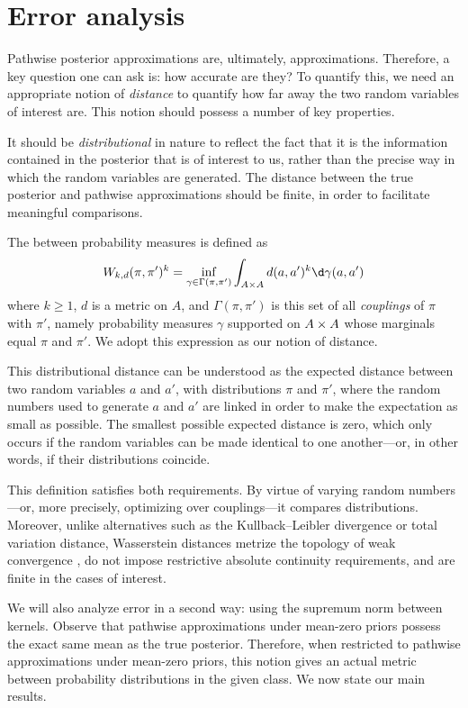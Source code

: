 \documentclass[11pt]{book}
\begin{document}
\section{Error analysis}

Pathwise posterior approximations are, ultimately, approximations.
Therefore, a key question one can ask is: how accurate are they?
To quantify this, we need an appropriate notion of \emph{distance} to quantify how far away the two random variables of interest are.
This notion should possess a number of key properties.

\1  It should be \emph{distributional} in nature to reflect the fact that it is the information contained in the posterior that is of interest to us, rather than the precise way in which the random variables are generated.
\2 The distance between the true posterior and pathwise approximations should be finite, in order to facilitate meaningful comparisons.
\0 

The  \cite{villani08} between probability measures is defined as 
\[
W_{k,d}(\pi,\pi')^k = \inf_{\gamma\in\Gamma(\pi,\pi')} \int_{A\x A} d(a,a')^k \d\gamma(a,a')
\]
where $k \geq 1$, $d$ is a metric on $A$, and $\Gamma(\pi,\pi')$ is this set of all \emph{couplings} of $\pi$ with $\pi'$, namely probability measures $\gamma$ supported on $A\times A$ whose marginals equal $\pi$ and $\pi'$.
We adopt this expression as our notion of distance.

This distributional distance can be understood as the expected distance between two random variables $a$ and $a'$, with distributions $\pi$ and $\pi'$, where the random numbers used to generate $a$ and $a'$ are linked in order to make the expectation as small as possible.
The smallest possible expected distance is zero, which only occurs if the random variables can be made identical to one another---or, in other words, if their distributions coincide.

This definition satisfies both requirements. 
By virtue of varying random numbers---or, more precisely, optimizing over couplings---it compares distributions.
Moreover, unlike alternatives such as the Kullback--Leibler divergence or total variation distance, Wasserstein distances metrize the topology of weak convergence \cite{villani08} , do not impose restrictive absolute continuity requirements, and are finite in the cases of interest.

We will also analyze error in a second way: using the supremum norm between kernels.
Observe that pathwise approximations under mean-zero priors possess the exact same mean as the true posterior.
Therefore, when restricted to pathwise approximations under mean-zero priors, this notion gives an actual metric between probability distributions in the given class.
We now state our main results.
\end{document}
